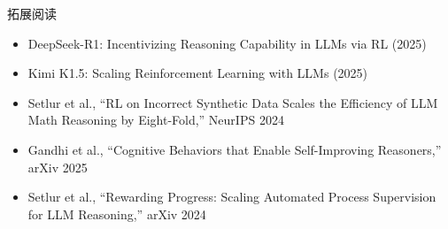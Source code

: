 \begin{knowledgebox}{拓展阅读}
\begin{itemize}
    \item DeepSeek-R1: Incentivizing Reasoning Capability in LLMs via RL (2025)
    \item Kimi K1.5: Scaling Reinforcement Learning with LLMs (2025)
    \item Setlur et al., ``RL on Incorrect Synthetic Data Scales the Efficiency of LLM Math Reasoning by Eight-Fold,'' NeurIPS 2024
    \item Gandhi et al., ``Cognitive Behaviors that Enable Self-Improving Reasoners,'' arXiv 2025
    \item Setlur et al., ``Rewarding Progress: Scaling Automated Process Supervision for LLM Reasoning,'' arXiv 2024
\end{itemize}
\end{knowledgebox}


